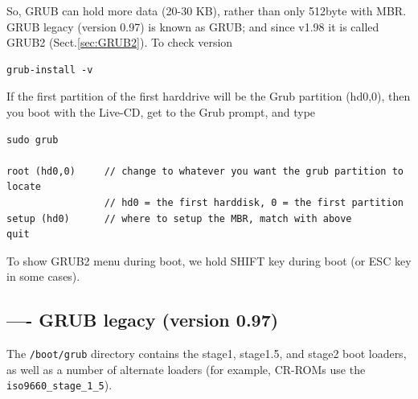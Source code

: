 So, GRUB can hold more data (20-30 KB), rather than only 512byte with MBR. GRUB
legacy (version 0.97) is known as GRUB; and since v1.98 it is called GRUB2
(Sect.\ref{sec:GRUB2}). To check version
\begin{verbatim}
grub-install -v
\end{verbatim}


If the first partition of the first harddrive will be the Grub partition
(hd0,0), then you boot with the Live-CD, get to the Grub prompt, and type
\begin{verbatim}
sudo grub

root (hd0,0)     // change to whatever you want the grub partition to locate
                 // hd0 = the first harddisk, 0 = the first partition
setup (hd0)      // where to setup the MBR, match with above
quit
\end{verbatim}

To show GRUB2 menu during boot, we hold SHIFT key during boot (or ESC key in
some cases).

\subsection{---- GRUB legacy (version 0.97)}
\label{sec:GRUB1}

The \verb!/boot/grub! directory contains the stage1, stage1.5, and stage2 boot
loaders, as well as a number of alternate loaders (for example, CR-ROMs use the
\verb!iso9660_stage_1_5!).

